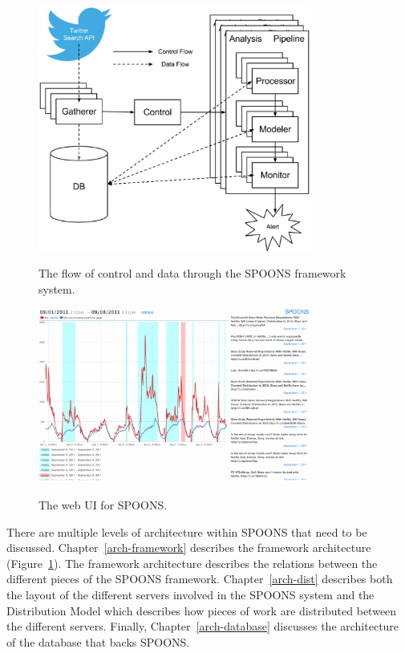\documentclass[12pt]{ucthesis}
\newcommand{\captionfonts}{\small\bf\ssp}
\begin{document}
\begin{figure}
   \begin{center}
      \includegraphics[width=0.8\textwidth]{images/SPOONS_Framework_Architecture.eps}
      \captionfonts
      \caption[SPOONS Framework Architecture]{The flow of control and data through the SPOONS framework system.}
      \label{fig:frameworkArch}
   \end{center}
\end{figure}

\begin{figure}
   \begin{center}
      \includegraphics[width=0.8\textwidth]{images/ui.eps}
      \captionfonts
      \caption[SPOONS UI]{The web UI for SPOONS.}
      \label{fig:ui}
   \end{center}
\end{figure}

There are multiple levels of architecture within SPOONS that need to be discussed.
Chapter~\ref{arch-framework} describes the framework architecture (Figure~\ref{fig:frameworkArch}).
The framework architecture describes the relations between the different pieces of the SPOONS framework.
Chapter~\ref{arch-dist} describes both the layout of the different servers involved in the SPOONS system
and the Distribution Model which describes how pieces of work are distributed between the different servers.
Finally, Chapter~\ref{arch-database} discusses the architecture of the database that backs SPOONS.
\end{document}
